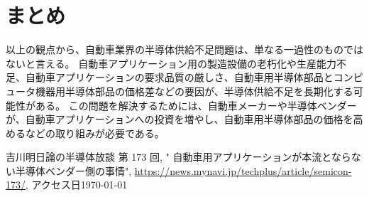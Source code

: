 \documentclass[a4j, twocolumn, uplatex]{jsarticle}
\numberwithin{equation}{section}
\begin{document}
	\section{まとめ}
		以上の観点から、自動車業界の半導体供給不足問題は、単なる一過性のものではないと言える。
		自動車アプリケーション用の製造設備の老朽化や生産能力不足、自動車アプリケーションの要求品質の厳しさ、自動車用半導体部品とコンピュータ機器用半導体部品の価格差などの要因が、半導体供給不足を長期化する可能性がある。
		この問題を解決するためには、自動車メーカーや半導体ベンダーが、自動車アプリケーションへの投資を増やし、自動車用半導体部品の価格を高めるなどの取り組みが必要である。

\begin{thebibliography}{99}
		吉川明日論の半導体放談 第 173 回, "		自動車用アプリケーションが本流とならない半導体ベンダー側の事情", \url{https://news.mynavi.jp/techplus/article/semicon-173/}, アクセス日{\today}
	\end{thebibliography}
\end{document}
